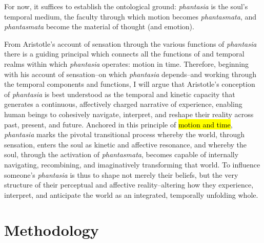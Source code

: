 \documentclass{article}
\begin{document}
For now, it suffices to establish the ontological ground: \textit{phantasia} is the soul's temporal medium, the faculty through which motion becomes \textit{phantasmata}, and \textit{phantasmata} become the material of thought (and emotion). 



From Aristotle's account of sensation through the various functions of \textit{phantasia} there is a guiding principal which connects all the functions of and temporal realms within which \textit{phantasia} operates: motion in time. Therefore, beginning with his account of sensation--on which \textit{phantasia} depends--and working through the temporal components and functions, I will argue that Aristotle's conception of \textit{phantasia} is best understood as the temporal and kinetic capacity that generates a continuous, affectively charged narrative of experience, enabling human beings to cohesively navigate, interpret, and reshape their reality across past, present, and future. Anchored in this principle of \hl{motion and time}, \textit{phantasia} marks the pivotal transitional process whereby the world, through sensation, enters the soul as kinetic and affective resonance, and whereby the soul, through the activation of \textit{phantasmata}, becomes capable of internally navigating, recombining, and imaginatively transforming that world. To influence someone's \textit{phantasia} is thus to shape not merely their beliefs, but the very structure of their perceptual and affective reality--altering how they experience, interpret, and anticipate the world as an integrated, temporally unfolding whole. 


\section{Methodology}
\end{document}
